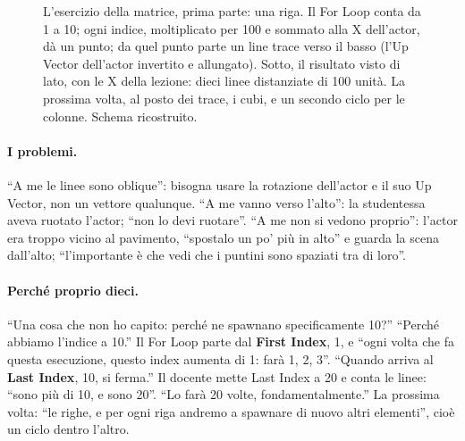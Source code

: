 \begin{figure}[htbp]
\caption{L'esercizio della matrice, prima parte: una riga. Il For Loop conta da 1 a 10;
ogni indice, moltiplicato per 100 e sommato alla X dell'actor, dà un punto; da quel punto
parte un line trace verso il basso (l'Up Vector dell'actor invertito e allungato). Sotto,
il risultato visto di lato, con le X della lezione: dieci linee distanziate di 100 unità.
La prossima volta, al posto dei trace, i cubi, e un secondo ciclo per le colonne. Schema
ricostruito.}
\label{ue5:fig:matrice}
\end{figure}

\paragraph{I problemi.} ``A me le linee sono oblique'': bisogna usare la rotazione
dell'actor e il suo Up Vector, non un vettore qualunque. ``A me vanno verso l'alto'':
la studentessa aveva ruotato l'actor; ``non lo devi ruotare''. ``A me non si vedono
proprio'': l'actor era troppo vicino al pavimento, ``spostalo un po' più in alto'' e
guarda la scena dall'alto; ``l'importante è che vedi che i puntini sono spaziati tra di
loro''.

\paragraph{Perché proprio dieci.} ``Una cosa che non ho capito: perché ne spawnano
specificamente 10?'' ``Perché abbiamo l'indice a 10.'' Il For Loop parte dal
\textbf{First Index}, 1, e ``ogni volta che fa questa esecuzione, questo index aumenta di
1: farà 1, 2, 3''. ``Quando arriva al \textbf{Last Index}, 10, si ferma.'' Il docente
mette Last Index a 20 e conta le linee: ``sono più di 10, e sono 20''. ``Lo farà 20 volte,
fondamentalmente.'' La prossima volta: ``le righe, e per ogni riga andremo a spawnare di
nuovo altri elementi'', cioè un ciclo dentro l'altro.

